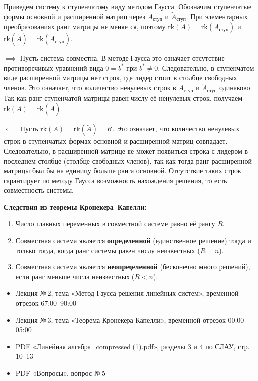 \begin{tcolorbox}[title=Доказательство, breakable]
Приведем систему к ступенчатому виду методом Гаусса. Обозначим ступенчатые формы основной и расширенной матриц через $A_{ступ}$ и $\tilde{A}_{ступ}$. При элементарных преобразованиях ранг матрицы не меняется, поэтому $\mathrm{rk}(A) = \mathrm{rk}(A_{ступ})$ и $\mathrm{rk}(\tilde{A}) = \mathrm{rk}(\tilde{A}_{ступ})$.

$\implies$ Пусть система совместна. В методе Гаусса это означает отсутствие противоречивых уравнений вида $0 = b^*$ при $b^* \neq 0$. Следовательно, в ступенчатом виде расширенной матрицы нет строк, где лидер стоит в столбце свободных членов. Это означает, что количество ненулевых строк в $A_{ступ}$ и $\tilde{A}_{ступ}$ одинаково. Так как ранг ступенчатой матрицы равен числу её ненулевых строк, получаем $\mathrm{rk}(A) = \mathrm{rk}(\tilde{A})$.

$\impliedby$ Пусть $\mathrm{rk}(A) = \mathrm{rk}(\tilde{A}) = R$. Это означает, что количество ненулевых строк в ступенчатых формах основной и расширенной матриц совпадает. Следовательно, в расширенной матрице не может появиться строка с лидером в последнем столбце (столбце свободных членов), так как тогда ранг расширенной матрицы был бы на единицу больше ранга основной. Отсутствие таких строк гарантирует по методу Гаусса возможность нахождения решения, то есть совместность системы.
\end{tcolorbox}

\textbf{Следствия из теоремы Кронекера--Капелли:}
\begin{enumerate}
    \item Число главных переменных в совместной системе равно её рангу $R$.
    \item Совместная система является \textbf{определенной} (единственное решение) тогда и только тогда, когда ранг системы равен числу неизвестных ($R = n$).
    \item Совместная система является \textbf{неопределенной} (бесконечно много решений), если ранг меньше числа неизвестных ($R < n$).
\end{enumerate}

\begin{tcolorbox}[title=Источники, colback=gray!10]
\begin{itemize}
  \item Лекция №\,2, тема «Метод Гаусса решения линейных систем», временной отрезок 67:00--90:00
  \item Лекция №\,3, тема «Теорема Кронекера-Капелли», временной отрезок 00:00--05:00
  \item PDF «Линейная алгебра\_compressed (1).pdf», разделы 3 и 4 по СЛАУ, стр. 10--13
  \item PDF «Вопросы», вопрос №\,5
\end{itemize}
\end{tcolorbox}
